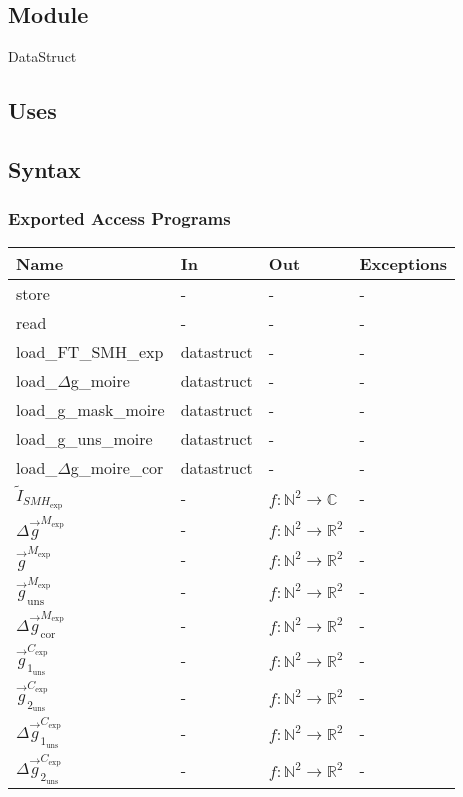 \documentclass[12pt, titlepage]{article}
\begin{document}
\subsection{Module}
DataStruct
\subsection{Uses}

\subsection{Syntax}

\subsubsection{Exported Access Programs}

\begin{center}
\begin{tabular}{p{4cm} p{4cm} p{4cm} p{2cm}}
\hline
\textbf{Name} & \textbf{In} & \textbf{Out} & \textbf{Exceptions} \\
\hline
store & - & - & - \\
read & - & - & - \\
load{\_}FT{\_}SMH{\_}exp & datastruct & - & - \\
load{\_}$\Delta$g{\_}moire & datastruct & - & - \\
load{\_}g{\_}mask{\_}moire & datastruct & - & - \\
load{\_}g{\_}uns{\_}moire & datastruct & - & - \\
load{\_}$\Delta$g{\_}moire{\_}cor & datastruct & - & - \\
$\widetilde{I}_{\mathit{SMH}_{\text{exp}}}$ & - & $f:\mathbb{N}^2\rightarrow\mathbb{C}$ & - \\
$\Delta \overrightarrow{g}^{M_{\text{exp}}}$ & - & $f:\mathbb{N}^2\rightarrow\mathbb{R}^2$ & - \\
$\overrightarrow{g}^{M_{\text{exp}}}$ & - & $f:\mathbb{N}^2\rightarrow\mathbb{R}^2$ & - \\
$\overrightarrow{g}_{\text{uns}}^{M_{\text{exp}}}$ & - & $f:\mathbb{N}^2\rightarrow\mathbb{R}^2$ & - \\
$\Delta\overrightarrow{g}_{\text{cor}}^{M_{\text{exp}}}$ & - & $f:\mathbb{N}^2\rightarrow\mathbb{R}^2$ & - \\
$\overrightarrow{g}_{1_{\text{uns}}}^{C_{\text{exp}}}$ & - & $f:\mathbb{N}^2\rightarrow\mathbb{R}^2$ & - \\
$\overrightarrow{g}_{2_{\text{uns}}}^{C_{\text{exp}}}$ & - & $f:\mathbb{N}^2\rightarrow\mathbb{R}^2$ & - \\
$\Delta \overrightarrow{g}_{1_{\text{uns}}}^{C_{\text{exp}}}$ & - & $f:\mathbb{N}^2\rightarrow\mathbb{R}^2$ & - \\
$\Delta \overrightarrow{g}_{2_{\text{uns}}}^{C_{\text{exp}}}$ & - & $f:\mathbb{N}^2\rightarrow\mathbb{R}^2$ & - \\
\hline
\end{tabular}
\end{center}
\end{document}
